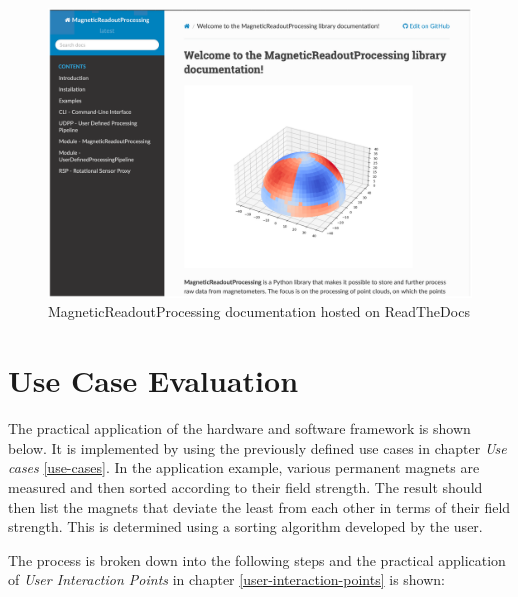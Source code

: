 \begin{figure}
\centering
\includegraphics{./generated_images/border_MagneticReadoutProcessing_documentation_hosted_on_ReadTheDocs.png}
\caption{MagneticReadoutProcessing documentation hosted on ReadTheDocs
\label{MagneticReadoutProcessing_documentation_hosted_on_ReadTheDocs.png}}
\end{figure}

\hypertarget{use-case-evaluation}{%
\chapter{Use Case Evaluation}\label{use-case-evaluation}}

The practical application of the hardware and software framework is
shown below. It is implemented by using the previously defined use cases
in chapter \emph{Use cases} \ref{use-cases}. In the application example,
various permanent magnets are measured and then sorted according to
their field strength. The result should then list the magnets that
deviate the least from each other in terms of their field strength. This
is determined using a sorting algorithm developed by the user.

The process is broken down into the following steps and the practical
application of \emph{User Interaction Points} in chapter
\ref{user-interaction-points} is shown:

